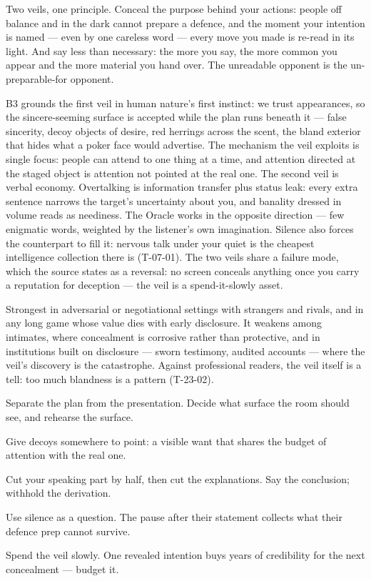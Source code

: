 \begin{core}
Two veils, one principle. Conceal the purpose behind your actions: people off balance and in the dark cannot prepare a defence, and the moment your intention is named --- even by one careless word --- every move you made is re-read in its light. And say less than necessary: the more you say, the more common you appear and the more material you hand over. The unreadable opponent is the un-preparable-for opponent.
\end{core}
\begin{mechanism}
B3 grounds the first veil in human nature's first instinct: we trust appearances, so the sincere-seeming surface is accepted while the plan runs beneath it --- false sincerity, decoy objects of desire, red herrings across the scent, the bland exterior that hides what a poker face would advertise. The mechanism the veil exploits is single focus: people can attend to one thing at a time, and attention directed at the staged object is attention not pointed at the real one. The second veil is verbal economy. Overtalking is information transfer plus status leak: every extra sentence narrows the target's uncertainty about you, and banality dressed in volume reads as neediness. The Oracle works in the opposite direction --- few enigmatic words, weighted by the listener's own imagination. Silence also forces the counterpart to fill it: nervous talk under your quiet is the cheapest intelligence collection there is (T-07-01). The two veils share a failure mode, which the source states as a reversal: no screen conceals anything once you carry a reputation for deception --- the veil is a spend-it-slowly asset.
\end{mechanism}
\begin{conditions}
Strongest in adversarial or negotiational settings with strangers and rivals, and in any long game whose value dies with early disclosure. It weakens among intimates, where concealment is corrosive rather than protective, and in institutions built on disclosure --- sworn testimony, audited accounts --- where the veil's discovery is the catastrophe. Against professional readers, the veil itself is a tell: too much blandness is a pattern (T-23-02).
\end{conditions}
\begin{application}
  \item Separate the plan from the presentation. Decide what surface the room should see, and rehearse the surface.
  \item Give decoys somewhere to point: a visible want that shares the budget of attention with the real one.
  \item Cut your speaking part by half, then cut the explanations. Say the conclusion; withhold the derivation.
  \item Use silence as a question. The pause after their statement collects what their defence prep cannot survive.
  \item Spend the veil slowly. One revealed intention buys years of credibility for the next concealment --- budget it.
\end{application}
